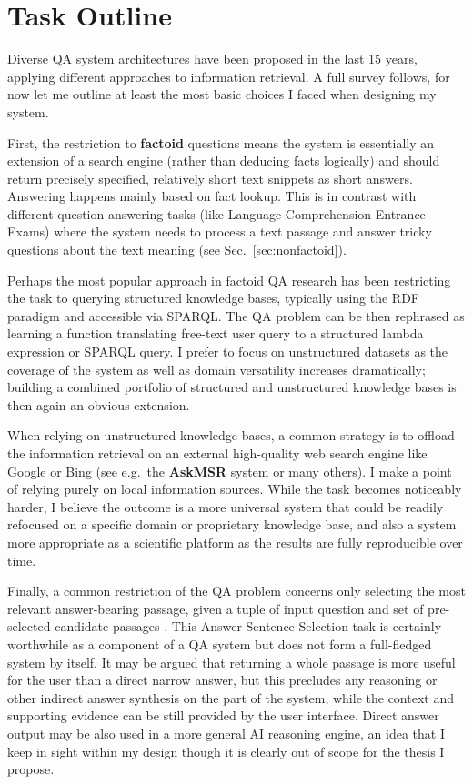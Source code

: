 \section{Task Outline}

Diverse QA system architectures have been proposed in the last 15 years,
applying different approaches to information retrieval.  A full survey
follows, for now let me outline at least the most basic choices I faced
when designing my system.

First, the restriction to \textbf{factoid} questions means the system
is essentially an extension of a search engine (rather than deducing
facts logically) and should return precisely specified, relatively short
text snippets as short answers.  Answering happens mainly based on fact
lookup.  This is in contrast with different question answering tasks
(like Language Comprehension Entrance Exams) where the system needs to
process a text passage and answer tricky questions about the text meaning
(see Sec.~\ref{sec:nonfactoid}).

Perhaps the most popular approach in factoid QA research has been restricting
the task to querying structured knowledge bases, typically using the
RDF paradigm and accessible via SPARQL\@.  The QA problem can
be then rephrased as learning a function translating free-text user query
to a structured lambda expression or SPARQL query. \citep{Semantic2013Berant, Semantic2014Bordes}
I prefer to focus on unstructured datasets as the coverage of the system
as well as domain versatility increases dramatically; building a combined
portfolio of structured and unstructured knowledge bases
is then again an obvious extension.

When relying on unstructured knowledge bases, a common strategy is to offload
the information retrieval on an external high-quality web search engine
like Google or Bing (see e.g.\ the \textbf{AskMSR} system \citep{AskMSR}
or many others).
I make a point of relying purely on local information sources.%
While the task becomes noticeably harder,
I believe the outcome is a more
universal system that could be readily refocused on a specific domain
or proprietary knowledge base, and also a system more appropriate as
a scientific platform as the results are fully reproducible over time.

Finally, a common restriction of the QA problem concerns only selecting
the most relevant answer-bearing passage, given a tuple of input question
and set of pre-selected candidate passages \citep{WangQAGrammar}.
This Answer Sentence Selection task is certainly
worthwhile as a component of a QA system but does not form a full-fledged
system by itself.
It may be argued that returning a whole passage is more useful for the user than a direct narrow answer,
but this precludes any reasoning or other indirect answer synthesis on the part of the system,
while the context and supporting evidence can be still provided by the user interface.
Direct answer output may be also used in a more general AI reasoning engine,
an idea that I keep in sight within my design though it is clearly
out of scope for the thesis I propose.

